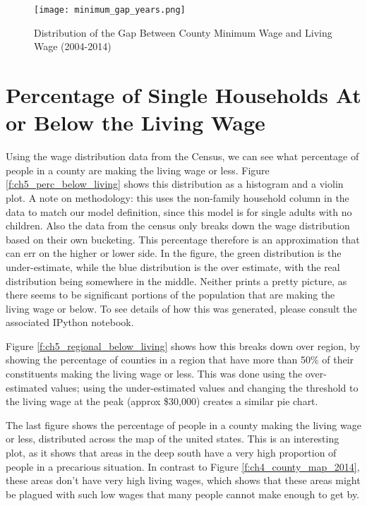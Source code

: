 \begin{figure}[H]
    \centering
        \texttt{[image: minimum\_gap\_years.png]}
        \caption{Distribution of the Gap Between County Minimum Wage and Living Wage (2004-2014)}
    \label{f:ch5_minimum_gap_years}
\end{figure}


\section{Percentage of Single Households At or Below the Living Wage}

Using the wage distribution data from the Census, we can see what percentage of people in a county are making the living wage or less. Figure \ref{f:ch5_perc_below_living} shows this distribution as a histogram and a violin plot. A note on methodology: this uses the non-family household column in the data to match our model definition, since this model is for single adults with no children. Also the data from the census only breaks down the wage distribution based on their own bucketing. This percentage therefore is an approximation that can err on the higher or lower side. In the figure, the green distribution is the under-estimate, while the blue distribution is the over estimate, with the real distribution being somewhere in the middle. Neither prints a pretty picture, as there seems to be significant portions of the population that are making the living wage or below. To see details of how this was generated, please consult the associated IPython notebook.

Figure \ref{f:ch5_regional_below_living} shows how this breaks down over region, by showing the percentage of counties in a region that have more than 50\% of their constituents making the living wage or less. This was done using the over-estimated values; using the under-estimated values and changing the threshold to the living wage at the peak (approx \$30,000) creates a similar pie chart.

The last figure shows the percentage of people in a county making the living wage or less, distributed across the map of the united states. This is an interesting plot, as it shows that areas in the deep south have a very high proportion of people in a precarious situation. In contrast to Figure \ref{f:ch4_county_map_2014}, these areas don't have very high living wages, which shows that these areas might be plagued with such low wages that many people cannot make enough to get by.

